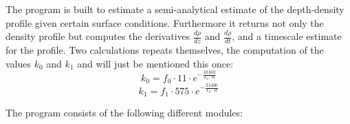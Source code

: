\documentclass[../../CompleteThesis/Complete_1stDraft.tex]{subfiles}
\begin{document}
	The program is built to estimate a semi-analytical estimate of the depth-density profile given certain surface conditions. Furthermore it returns not only the density profile but computes the derivatives $\frac{d\rho}{dz}$ and $\frac{d\rho}{dt}$, and a timescale estimate for the profile. Two calculations repeats themselves, the computation of the values $k_0$ and $k_1$ and will just be mentioned this once:
	\begin{equation}
		k_0 = f_0\cdot 11\cdot e^{-\frac{10160}{T_0\cdot R}}
		\label{Eq:k0}
	\end{equation}
	\begin{equation}
		k_1 = f_1\cdot 575\cdot e^{-\frac{21400}{T_0\cdot R}}
		\label{Eq:k1}
	\end{equation}
	
	The program consists of the following different modules:
\end{document}
